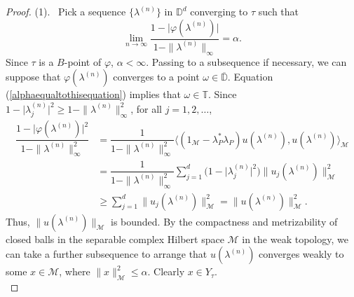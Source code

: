\documentclass[11pt, reqno]{amsart}
\newcommand\1{\boldsymbol {1}}
\numberwithin{equation}{section}
\begin{document}
\begin{proof} (1).~ Pick a sequence $\{\lambda^{(n)}\}$ in $\mathbb{D}^{d}$ converging to $\tau$ such that 
\begin{equation}\label{alphaequaltothisequation}
\lim_{n\rightarrow \infty} \dfrac{1-\lvert \varphi(\lambda^{(n)})\rvert}{1-\|\lambda^{(n)}\|_{\infty}}=\alpha.
\end{equation}
Since $\tau$ is a $B$-point of $\varphi$, $\alpha<\infty$. Passing to a subsequence if necessary, we can suppose that $\varphi(\lambda^{(n)})$ converges to a point $\omega\in\overline{\mathbb{D}}$. Equation (\ref{alphaequaltothisequation}) implies that $\omega\in\mathbb{T}$. Since $1-\lvert \lambda^{(n)}_{j} \rvert^{2} \geq 1-\|\lambda^{(n)}\|^{2}_{\infty}$, for all $j=1,2, \dots$,
\begin{align*}
\dfrac{1-\lvert \varphi(\lambda^{(n)})\rvert^{2}}{1-\|\lambda^{(n)}\|_{\infty}^{2}}&=\dfrac{1}{1-\|\lambda^{(n)}\|_{\infty}^{2}}\Big\langle (1_{\mathcal{M}}-\lambda_{P}^{*}\lambda_{P})u(\lambda^{(n)}),u(\lambda^{(n)})\Big\rangle_{\mathcal{M}}\nonumber\\
&=\dfrac{1}{1-\|\lambda^{(n)}\|_{\infty}^{2}}\sum_{j=1}^{d}\big(1-\lvert \lambda^{(n)}_{j}\rvert^{2}\big) \| u_{j}(\lambda^{(n)})\|_{\mathcal{M}}^{2}\\
&\geq \sum_{j=1}^{d}\| u_{j}(\lambda^{(n)})\|_{\mathcal{M}}^{2}
= \|u(\lambda^{(n)})\|_{\mathcal{M}}^{2}.\nonumber
\end{align*}
Thus, $\|u(\lambda^{(n)})\|_{\mathcal{M}}$ is bounded. By the compactness and metrizability of closed balls in the separable complex Hilbert space $\mathcal{M}$ in the weak topology, we can take a further subsequence to arrange that $u(\lambda^{(n)})$ converges weakly to some $x\in\mathcal{M}$, where $\|x\|_{\mathcal{M}}^{2}\leq \alpha$. Clearly $x\in Y_{\tau}$.\\


\end{proof}
\end{document}
